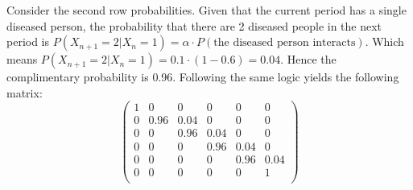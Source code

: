 \documentclass[10pt,a4paper]{article}
\begin{document}
\begin{flushleft}
Consider the second row probabilities.  Given that the current
period has a single diseased person, the probability that there
are 2 diseased people in the next period is $P(X_{n+1}=2|X_n=1) =
\alpha \cdot P(\textrm{the diseased person interacts})$. Which
means $P(X_{n+1}=2|X_n=1) = 0.1 \cdot (1-0.6) = 0.04$. Hence the
complimentary probability is 0.96. Following the same logic yields
the following matrix:
\[ \left( \begin{array}{cccccc}
1 & 0 & 0 & 0 & 0 & 0  \\
0 & 0.96 &  0.04 & 0 & 0 & 0  \\
0 & 0 & 0.96  & 0.04 & 0 & 0  \\
0 & 0 & 0 & 0.96 & 0.04 & 0  \\
0 & 0 & 0 & 0 & 0.96 & 0.04  \\
0 & 0 & 0 & 0 & 0 & 1  \\
\end{array} \right)\]
\end{flushleft}
\end{document}
